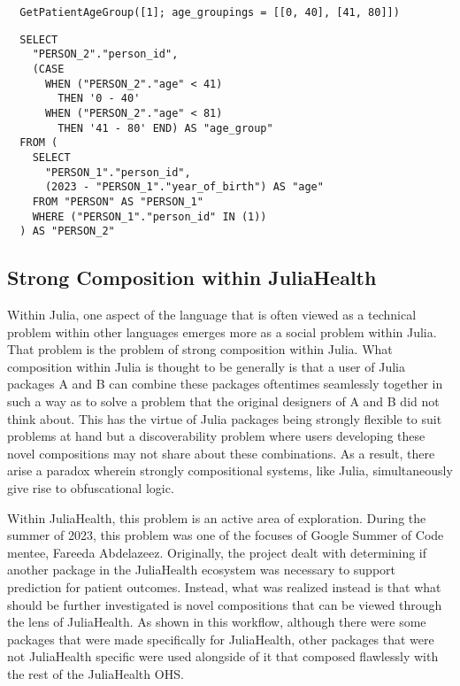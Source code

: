 \documentclass{juliacon}
\begin{document}
\begin{listing}[!ht]
\begin{verbatim}
  GetPatientAgeGroup([1]; age_groupings = [[0, 40], [41, 80]])
\end{verbatim}
\caption{}
\label{listing:}
\end{listing}

\begin{listing}[!ht]
\begin{verbatim}
  SELECT
    "PERSON_2"."person_id",
    (CASE 
      WHEN ("PERSON_2"."age" < 41) 
        THEN '0 - 40' 
      WHEN ("PERSON_2"."age" < 81) 
        THEN '41 - 80' END) AS "age_group"
  FROM (
    SELECT
      "PERSON_1"."person_id",
      (2023 - "PERSON_1"."year_of_birth") AS "age"
    FROM "PERSON" AS "PERSON_1"
    WHERE ("PERSON_1"."person_id" IN (1))
  ) AS "PERSON_2"
\end{verbatim}
\caption{}
\label{listing:}
\end{listing}

\subsection{Strong Composition within JuliaHealth}

Within Julia, one aspect of the language that is often viewed as a technical problem within other languages emerges more as a social problem within Julia.
That problem is the problem of strong composition within Julia.
What composition within Julia is thought to be generally is that a user of Julia packages A and B can combine these packages oftentimes seamlessly together in such a way as to solve a problem that the original designers of A and B did not think about.
This has the virtue of Julia packages being strongly flexible to suit problems at hand but a discoverability problem where users developing these novel compositions may not share about these combinations.
As a result, there arise a paradox wherein strongly compositional systems, like Julia, simultaneously give rise to obfuscational logic.

Within JuliaHealth, this problem is an active area of exploration.
During the summer of 2023, this problem was one of the focuses of Google Summer of Code mentee, Fareeda Abdelazeez.
Originally, the project dealt with determining if another package in the JuliaHealth ecosystem was necessary to support prediction for patient outcomes.
Instead, what was realized instead is that what should be further investigated is novel compositions that can be viewed through the lens of JuliaHealth.
As shown in this workflow, although there were some packages that were made specifically for JuliaHealth, other packages that were not JuliaHealth specific were used alongside of it that composed flawlessly with the rest of the JuliaHealth OHS.
\end{document}
